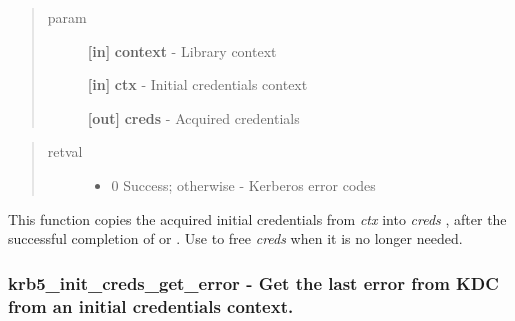 \documentclass[letterpaper,10pt,english]{sphinxmanual}
\begin{document}
\begin{quote}\begin{description}
\item[{param}] \leavevmode
\textbf{{[}in{]}} \textbf{context} - Library context

\textbf{{[}in{]}} \textbf{ctx} - Initial credentials context

\textbf{{[}out{]}} \textbf{creds} - Acquired credentials

\end{description}\end{quote}
\begin{quote}\begin{description}
\item[{retval}] \leavevmode\begin{itemize}
\item {} 
0   Success; otherwise - Kerberos error codes

\end{itemize}

\end{description}\end{quote}

This function copies the acquired initial credentials from \emph{ctx} into \emph{creds} , after the successful completion of {\hyperref[appdev/refs/api/krb5_init_creds_get:krb5_init_creds_get]{}} or {\hyperref[appdev/refs/api/krb5_init_creds_step:krb5_init_creds_step]{}} . Use {\hyperref[appdev/refs/api/krb5_free_cred_contents:krb5_free_cred_contents]{}} to free \emph{creds} when it is no longer needed.


\subsubsection{krb5\_init\_creds\_get\_error -  Get the last error from KDC from an initial credentials context.}
\label{appdev/refs/api/krb5_init_creds_get_error:krb5-init-creds-get-error-get-the-last-error-from-kdc-from-an-initial-credentials-context}\label{appdev/refs/api/krb5_init_creds_get_error::doc}

\begin{fulllineitems}
\label{appdev/refs/api/krb5_init_creds_get_error:krb5_init_creds_get_error}
\end{fulllineitems}
\end{document}
